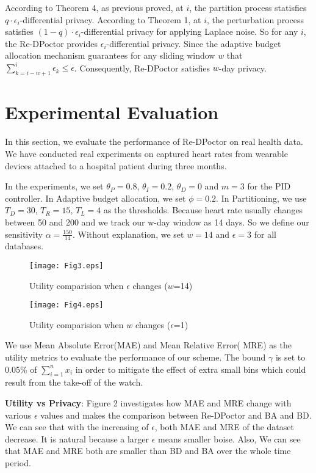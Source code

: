 \documentclass[10pt,conference]{IEEEtran}
\begin{document}
According to Theorem 4, as previous proved, at  $i$, the partition process statisfies $q\cdot \epsilon_i$-differential privacy. According to Theorem 1, at  $i$, the perturbation process satisfies $(1-q)\cdot \epsilon_i$-differential privacy for applying Laplace noise. So for any  $i$, the Re-DPoctor provides $\epsilon_i$-differential privacy. Since the adaptive budget allocation mechanism guarantees for any sliding window $w$ that $\sum_{k=i-w+1}^{i}\epsilon_k\leq \epsilon$. Consequently, Re-DPoctor satisfies $w$-day privacy.

	
\section{Experimental Evaluation}

In this section, we evaluate the performance of Re-DPoctor on real health data. We have conducted real experiments on captured heart rates from wearable devices attached to a hospital patient during three months.

In the experiments, we set $\theta_P=0.8$, $\theta_I=0.2$, $\theta_D=0$ and $m=3$ for the PID controller. In Adaptive budget allocation, we set $\phi=0.2$.  In Partitioning, we use $T_D =30$, $T_R=15$, $T_L=4$ as the thresholds. Because heart rate usually changes between 50 and 200 and we track our w-day window as 14 days. So we define our sensitivity $\alpha = \frac{150}{14}$. Without explanation, we set $w=14$ and $\epsilon=3$ for all databases.

\begin{figure}[!t]
	\centerline{\texttt{[image: Fig3.eps]}}	
	\caption{Utility comparision when $\epsilon$ changes ($w$=14)}		
\end{figure}

\begin{figure}[!t]
	\centerline{\texttt{[image: Fig4.eps]}}	
	\caption{Utility comparision when $w$ changes ($\epsilon$=1)}		
\end{figure}


We use Mean Absolute Error(MAE) and Mean Relative Error( MRE) as the utility metrics to evaluate the performance of our scheme. The bound $\gamma$ is set to 0.05\% of $\sum_{i=1}^{n}x_i$ in order to mitigate the effect of extra small bins which could result from the take-off of the watch.

\textbf{Utility vs Privacy}:
Figure 2 investigates how MAE and MRE change with various $\epsilon$ values and makes the comparison between Re-DPoctor and BA and BD\cite{kellaris2014differentially}. We can see that with the increasing of $\epsilon$, both MAE and MRE of the dataset decrease. It is natural because a larger $\epsilon$ means smaller boise. Also, We can see that MAE and MRE both are smaller than BD and BA over the whole time period.
\end{document}
